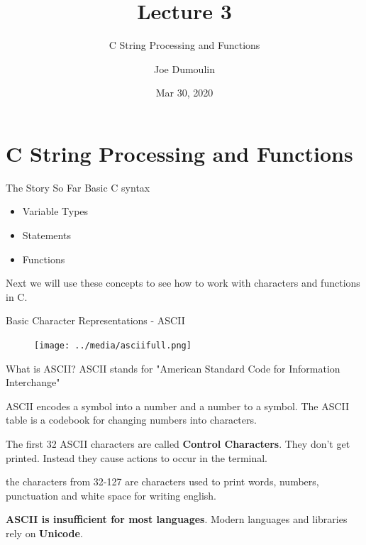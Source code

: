 \documentclass[10pt]{beamer}
\title{Lecture 3}
\subtitle{C String Processing and Functions}
\date{Mar 30, 2020}
\author{Joe Dumoulin}
\institute{Eastern Washington University}
\begin{document}
\maketitle
\section{C String Processing and Functions} 



\begin{frame}[fragile]{The Story So Far}
Basic C syntax

\begin{itemize}

\item Variable Types
\item Statements
\item Functions

\end{itemize}

Next we will use these concepts to see how to work with characters and functions in C.

\end{frame}
\begin{frame}[fragile]{Basic Character Representations - ASCII}

\begin{figure}[htp]
    \centering
    \texttt{[image: ../media/asciifull.png]}
    \label{fig:ASCII}
\end{figure}


\end{frame}
\begin{frame}[fragile]{What is ASCII?}
ASCII stands for "American Standard Code for Information Interchange"

ASCII encodes a symbol into a number and a number to a symbol.  The ASCII table is a codebook for changing numbers into characters.

The first 32 ASCII characters are called \textbf{Control Characters}.  They don't get printed.  Instead they cause actions to occur in the terminal.

the characters from  32-127 are characters used to print words, numbers, punctuation and white space for writing english.

\textbf{ASCII is insufficient for most languages}.  Modern languages and libraries rely on \textbf{Unicode}.


\end{frame}
\end{document}
